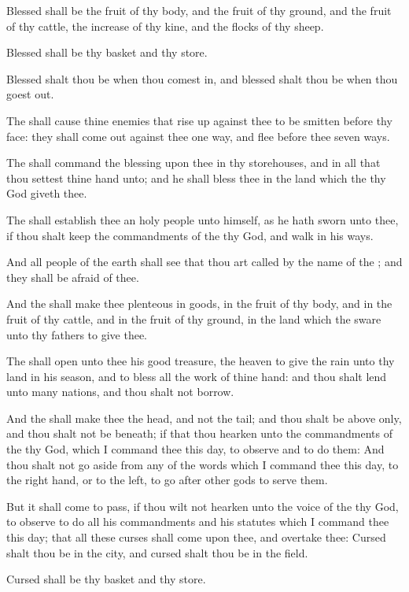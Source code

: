 \verse Blessed shall be the fruit of thy body, and the fruit of thy ground, and the fruit of thy cattle, the increase of thy kine, and the flocks of thy sheep.

\verse Blessed shall be thy basket and thy store.

\verse Blessed shalt thou be when thou comest in, and blessed shalt thou be when thou goest out.

\verse The \LORD shall cause thine enemies that rise up against thee to be smitten before thy face: they shall come out against thee one way, and flee before thee seven ways.

\verse The \LORD shall command the blessing upon thee in thy storehouses, and in all that thou settest thine hand unto; and he shall bless thee in the land which the \LORD thy God giveth thee.

\verse The \LORD shall establish thee an holy people unto himself, as he hath sworn unto thee, if thou shalt keep the commandments of the \LORD thy God, and walk in his ways.

\verse And all people of the earth shall see that thou art called by the name of the \LORD; and they shall be afraid of thee.

\verse And the \LORD shall make thee plenteous in goods, in the fruit of thy body, and in the fruit of thy cattle, and in the fruit of thy ground, in the land which the \LORD sware unto thy fathers to give thee.

\verse The \LORD shall open unto thee his good treasure, the heaven to give the rain unto thy land in his season, and to bless all the work of thine hand: and thou shalt lend unto many nations, and thou shalt not borrow.

\verse And the \LORD shall make thee the head, and not the tail; and thou shalt be above only, and thou shalt not be beneath; if that thou hearken unto the commandments of the \LORD thy God, which I command thee this day, to observe and to do them: \verse And thou shalt not go aside from any of the words which I command thee this day, to the right hand, or to the left, to go after other gods to serve them.

\verse But it shall come to pass, if thou wilt not hearken unto the voice of the \LORD thy God, to observe to do all his commandments and his statutes which I command thee this day; that all these curses shall come upon thee, and overtake thee: \verse Cursed shalt thou be in the city, and cursed shalt thou be in the field.

\verse Cursed shall be thy basket and thy store.


